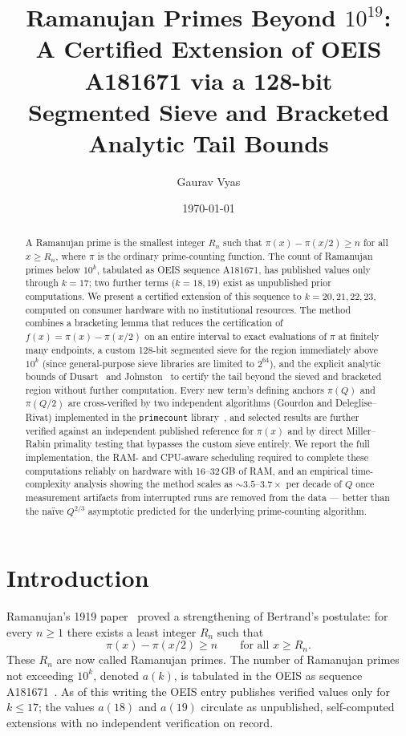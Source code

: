 \documentclass[11pt]{amsart}
\title[Ramanujan Primes Beyond $10^{19}$]{%
Ramanujan Primes Beyond $10^{19}$:\\
A Certified Extension of OEIS A181671 via a 128-bit\\
Segmented Sieve and Bracketed Analytic Tail Bounds}
\author{Gaurav Vyas}
\date{\today}
\newcommand{\pcount}{\pi}
\begin{document}
\begin{abstract}
A Ramanujan prime is the smallest integer $R_n$ such that
$\pcount(x) - \pcount(x/2) \geq n$ for all $x \geq R_n$, where $\pcount$ is
the ordinary prime-counting function. The count of Ramanujan primes below
$10^k$, tabulated as OEIS sequence A181671, has published values only
through $k=17$; two further terms ($k=18,19$) exist as unpublished prior
computations. We present a certified extension of this sequence to
$k=20,21,22,23$, computed on consumer hardware with no institutional
resources. The method combines
a bracketing lemma that reduces the certification of $f(x) = \pcount(x) -
\pcount(x/2)$ on an entire interval to exact evaluations of $\pcount$ at
finitely many endpoints, a custom 128-bit segmented sieve for the region
immediately above $10^{k}$ (since general-purpose sieve libraries are
limited to $2^{64}$), and the explicit analytic bounds of
Dusart~\cite{dusart2010} and Johnston~\cite{johnston2022} to certify the
tail beyond the sieved and bracketed region without further computation.
Every new term's defining anchors $\pcount(Q)$ and $\pcount(Q/2)$ are
cross-verified by two independent algorithms (Gourdon and
Deleglise--Rivat) implemented in the \texttt{primecount}
library~\cite{primecount}, and selected results are further verified
against an independent published reference for $\pcount(x)$ and by direct
Miller--Rabin primality testing that bypasses the custom sieve entirely.
We report the full implementation, the RAM- and CPU-aware scheduling
required to complete these computations reliably on hardware with
16--32\,GB of RAM, and an empirical time-complexity analysis showing the
method scales as $\sim\!3.5$--$3.7\times$ per decade of $Q$ once
measurement artifacts from interrupted runs are removed from the data
--- better than the na\"ive $Q^{2/3}$ asymptotic predicted for the
underlying prime-counting algorithm.
\end{abstract}

\maketitle

\section{Introduction}

Ramanujan's 1919 paper~\cite{ramanujan1919} proved a strengthening of
Bertrand's postulate: for every $n \geq 1$ there exists a least integer
$R_n$ such that
\[
  \pcount(x) - \pcount(x/2) \geq n \qquad \text{for all } x \geq R_n.
\]
These $R_n$ are now called Ramanujan primes. The number of Ramanujan
primes not exceeding $10^k$, denoted $a(k)$, is tabulated in the OEIS as
sequence A181671~\cite{oeisA181671}. As of this writing the OEIS entry
publishes verified values only for $k \leq 17$; the values $a(18)$ and
$a(19)$ circulate as unpublished, self-computed extensions with no
independent verification on record.
\end{document}
